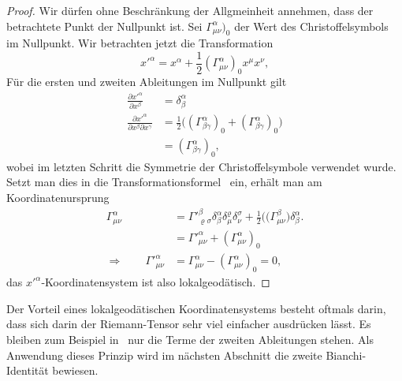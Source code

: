 \begin{proof}
Wir dürfen ohne Beschränkung der Allgmeinheit annehmen, dass der betrachtete
Punkt der Nullpunkt ist.
Sei $\Gamma^\alpha_{\mu\nu})_0$ der Wert des Christoffelsymbols im
Nullpunkt.
Wir betrachten jetzt die Transformation
\[
x'^\alpha = x^\alpha + \frac12(\Gamma^\alpha_{\mu\nu})_0x^\mu x^\nu,
\]
Für die ersten und zweiten Ableitungen im Nullpunkt gilt
\begin{align*}
\frac{\partial x'^\alpha}{\partial x^\beta}
&=
\delta^\alpha_\beta
\\
\frac{\partial x'^\alpha}{\partial x^\beta\partial x^\gamma}
&=
\frac12\bigl(
(\Gamma^\alpha_{\beta\gamma})_0 + (\Gamma^\alpha_{\beta\gamma})_0
\bigr)
\\
&=
(\Gamma^\alpha_{\beta\gamma})_0,
\end{align*}
wobei im letzten Schritt die Symmetrie der Christoffelsymbole verwendet wurde.
Setzt man dies in die
Transformationsformel~\label{skript:kruemmung:christoffeltransformation} ein,
erhält man am Koordinatenursprung
\begin{align*}
\Gamma^\alpha_{\mu\nu}
&=
\Gamma'^\beta_{\varrho\sigma}
\delta^\alpha_\beta
\delta^\varrho_\mu
\delta^\sigma_\nu
+
\frac12\bigl(
(\Gamma^\beta_{\mu\nu}
\bigr)
\delta^\alpha_\beta.
\\
&=
\Gamma'^\alpha_{\mu\nu}
+
(\Gamma^\alpha_{\mu\nu})_0
\\
\Rightarrow\qquad
\Gamma'^\alpha_{\mu\nu}
&=
\Gamma^\alpha_{\mu\nu}
-
(\Gamma^\alpha_{\mu\nu})_0
=0,
\end{align*}
das $x'^\alpha$-Koordinatensystem ist also lokalgeodätisch.
\end{proof}

Der Vorteil eines lokalgeodätischen Koordinatensystems besteht
oftmals darin, dass sich darin der Riemann-Tensor sehr viel
einfacher ausdrücken lässt.
Es bleiben zum Beispiel in~\label{skript:kruemmung:riemann2abl}
nur die Terme der zweiten Ableitungen stehen.
Als Anwendung dieses Prinzip wird im nächsten Abschnitt die zweite
Bianchi-Identität bewiesen.

